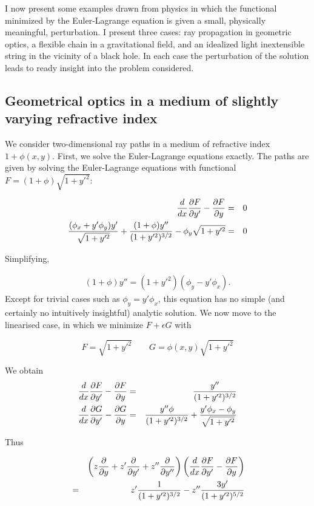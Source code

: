\documentclass[pdflatex,sn-mathphys-num]{sn-jnl}%
\theoremstyle{thmstyleone}%
\theoremstyle{thmstyletwo}%
\theoremstyle{thmstylethree}%
\begin{document}
I now present some examples drawn from physics in which the functional
minimized by the Euler-Lagrange equation is given a small, physically
meaningful, perturbation.  I present three cases: ray propagation in
geometric optics, a flexible chain in a gravitational field, and an
idealized light inextensible string in the vicinity of a black hole.
In each case the perturbation of the solution leads to ready insight
into the problem considered.

\subsection{Geometrical optics in a medium of slightly varying refractive index}

We consider two-dimensional ray paths in a medium of refractive index
$1+\phi(x,y)$.  First, we solve the Euler-Lagrange equations exactly.
The paths are given by solving the Euler-Lagrange equations with
functional $F=(1+\phi)\sqrt{1+y'^2}$:

\begin{eqnarray}
  \frac{d}{dx}\frac{\partial{F}}{\partial{y'}}-\frac{\partial{F}}{\partial{y}} &=& 0\nonumber\\
  \frac{(\phi_x+y'\phi_y)y'}{\sqrt{1+y'^2}}+\frac{(1+\phi)y''}{(1+y'^2)^{3/2}} -
  \phi_y\sqrt{1+y'^2} &=& 0
  \end{eqnarray}

Simplifying,

\begin{eqnarray}
 (1+\phi) y'' = (1+y'^2)(\phi_y - y'\phi_x).
\end{eqnarray}
%
Except for trivial cases such as $\phi_y=y'\phi_x$, this equation has
no simple (and certainly no intuitively insightful) analytic solution.
We now move to the linearised case, in which we minimize $F+\epsilon G$ with

\begin{equation}F=\sqrt{1+y'^2}\qquad
  G=\phi(x,y)\sqrt{1+y'^2}
\end{equation}

We obtain
\begin{eqnarray}
  \frac{d}{dx}\frac{\partial{F}}{\partial{y'}} - \frac{\partial{F}}{\partial{y}} &=& \frac{y''}{(1+y'^2)^{3/2}}\nonumber\\
  \frac{d}{dx}\frac{\partial{G}}{\partial{y'}} - \frac{\partial{G}}{\partial{y}} &=& \frac{y''\phi}{(1+y'^2)^{3/2}} + \frac{y'\phi_x - \phi_y}{\sqrt{1+y'^2}}
\end{eqnarray}

Thus

\begin{eqnarray}
&{}& \left(z\frac{\partial{}}{\partial{y}} + z'\frac{\partial{}}{\partial{y'}} + z''\frac{\partial{}}{\partial{y''}}\right)\left(\frac{d}{dx}\frac{\partial{F}}{\partial{y'}} - \frac{\partial{F}}{\partial{y}}\right)\nonumber\\
&=&  z'\frac{1}{(1+y'^2)^{3/2}} -z''\frac{3y'}{(1+y'^2)^{5/2}}
\end{eqnarray}
\end{document}
